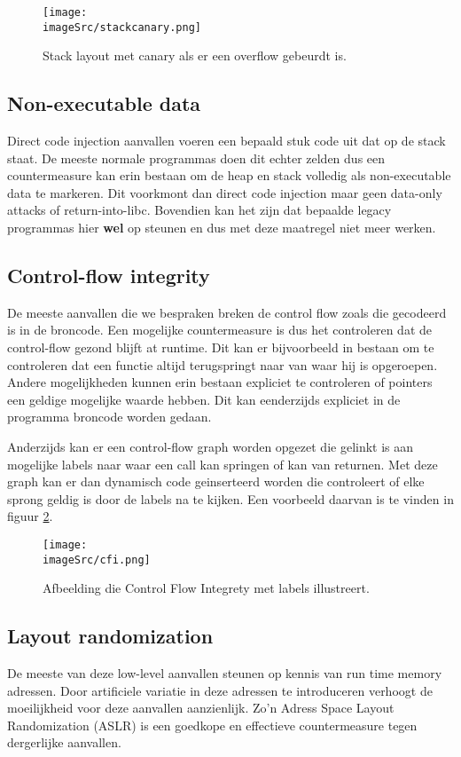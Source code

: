 \documentclass[../main.tex]{subfiles}
\begin{document}
\begin{figure}
\centering
\texttt{[image: \\imageSrc/stackcanary.png]}
\caption{Stack layout met canary als er een overflow gebeurdt is.}
\label{f:stackcanary}
\end{figure}

\subsection{Non-executable data}
Direct code injection aanvallen voeren een bepaald stuk code uit dat op de stack staat.
De meeste normale programmas doen dit echter zelden dus een countermeasure kan erin bestaan om de heap en stack volledig als non-executable data te markeren.
Dit voorkmont dan direct code injection maar geen data-only attacks of return-into-libc.
Bovendien kan het zijn dat bepaalde legacy programmas hier \textbf{wel} op steunen en dus met deze maatregel niet meer werken.

\subsection{Control-flow integrity}
De meeste aanvallen die we bespraken breken de control flow zoals die gecodeerd is in de broncode.
Een mogelijke countermeasure is dus het controleren dat de control-flow gezond blijft at runtime.
Dit kan er bijvoorbeeld in bestaan om te controleren dat een functie altijd terugspringt naar van waar hij is opgeroepen.
Andere mogelijkheden kunnen erin bestaan expliciet te controleren of pointers een geldige mogelijke waarde hebben.
Dit kan eenderzijds expliciet in de programma broncode worden gedaan.

Anderzijds kan er een control-flow graph worden opgezet die gelinkt is aan mogelijke labels naar waar een call kan springen of kan van returnen.
Met deze graph kan er dan dynamisch code geinserteerd worden die controleert of elke sprong geldig is door de labels na te kijken.
Een voorbeeld daarvan is te vinden in figuur \ref{f:cfi}.

\begin{figure}
\centering
\texttt{[image: \\imageSrc/cfi.png]}
\caption{Afbeelding die Control Flow Integrety met labels illustreert.}
\label{f:cfi}
\end{figure}

\subsection{Layout randomization}
De meeste van deze low-level aanvallen steunen op kennis van run time memory adressen.
Door artificiele variatie in deze adressen te introduceren verhoogt de moeilijkheid voor deze aanvallen aanzienlijk.
Zo'n Adress Space Layout Randomization (ASLR) is een goedkope en effectieve countermeasure tegen dergerlijke aanvallen.
\end{document}
